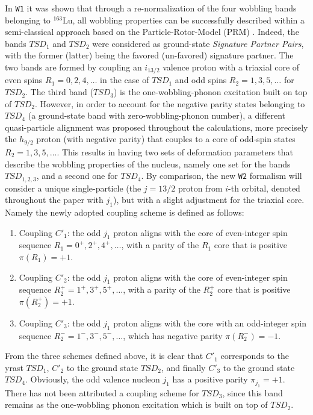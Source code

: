 \documentclass[myclassdoc,debug]{rjparticle}
\begin{document}
In \texttt{W1} it was shown that through a re-normalization of the four wobbling bands belonging to $^{163}$Lu, all wobbling properties can be successfully described within a semi-classical approach based on the Particle-Rotor-Model (PRM) \cite{bohr1998nuclear,hamamoto2002wobbling,frauendorf2014transverse,tanabe2006algebraic,wen2015wobbling}. Indeed, the bands $TSD_1$ and $TSD_2$ were considered as ground-state \emph{Signature Partner Pairs}, with the former (latter) being the favored (un-favored) signature partner. The two bands are formed by coupling an $i_{13/2}$ valence proton with a triaxial core of even spins $R_1=0,2,4,\dots$ in the case of $TSD_1$ and odd spins $R_2=1,3,5,\dots$ for $TSD_2$. The third band ($TSD_3$) is the one-wobbling-phonon excitation built on top of $TSD_2$.  However, in order to account for the negative parity states belonging to $TSD_4$ (a ground-state band with zero-wobbling-phonon number), a different quasi-particle alignment was proposed throughout the calculations, more precisely the $h_{9/2}$ proton (with negative parity) that couples to a core of odd-spin states $R_2=1,3,5,\dots$. This results in having two sets of deformation parameters that describe the wobbling properties of the nucleus, namely one set for the bands $TSD_{1,2,3}$, and a second one for $TSD_4$. By comparison, the new \texttt{W2} formalism will consider a unique single-particle (the $j=13/2$ proton from $i$-th orbital, denoted throughout the paper with $j_1$), but with a slight adjustment for the triaxial core. Namely the newly adopted coupling scheme is defined as follows: 
\begin{enumerate}
    \item Coupling $C'_1$: the odd $j_1$ proton aligns with the core of even-integer spin sequence $R_1=0^+,2^+,4^+,\dots$, with a parity of the $R_1$ core that is positive $\pi(R_1)=+1$.
    \item Coupling $C'_2$: the odd $j_1$ proton aligns with the core of even-integer spin sequence $R_2^+=1^+,3^+,5^+,\dots$, with a parity of the $R_2^+$ core that is positive $\pi(R_2^+)=+1$.
    \item Coupling $C'_3$: the odd $j_1$ proton aligns with the core with an odd-integer spin sequence $R_2^-=1^-,3^-,5^-,\dots$, which has negative parity $\pi(R_2^-)=-1$.
\end{enumerate}

From the three schemes defined above, it is clear that $C'_1$ corresponds to the yrast $TSD_1$, $C'_2$ to the ground state $TSD_2$, and finally $C'_3$ to the ground state $TSD_4$. Obviously, the odd valence nucleon $j_1$ has a positive parity $\pi_{j_1}=+1$. There has not been attributed a coupling scheme for $TSD_3$, since this band remains as the one-wobbling phonon excitation which is built on top of $TSD_2$.
\end{document}
